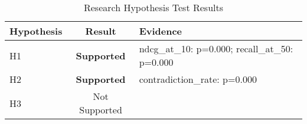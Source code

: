 \begin{table}[htbp]
\centering
\caption{Research Hypothesis Test Results}
\label{tab:hypothesis-results}
\begin{tabular}{lcl}
\toprule
Hypothesis & Result & Evidence \\
\midrule
H1 & \textbf{Supported} & ndcg_at_10: p=0.000; recall_at_50: p=0.000 \\
H2 & \textbf{Supported} & contradiction_rate: p=0.000 \\
H3 & Not Supported &  \\
\bottomrule
\end{tabular}
\end{table}
